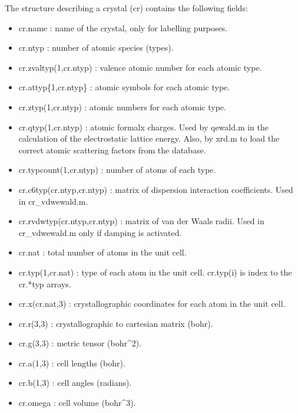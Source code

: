 \documentclass[a4paper]{article}
\begin{document}
The structure describing a crystal (cr) contains the following fields:
%
\begin{itemize}

\item cr.name : name of the crystal, only for labelling purposes.

\item cr.ntyp : number of atomic species (types).

\item cr.zvaltyp(1,cr.ntyp) : valence atomic number for each atomic
type.

\item cr.attyp\{1,cr.ntyp\} : atomic symbols for each atomic type.

\item cr.ztyp(1,cr.ntyp) : atomic numbers for each atomic type.

\item cr.qtyp(1,cr.ntyp) : atomic formalx charges. Used by qewald.m in the
calculation of the electrostatic lattice energy. Also, by xrd.m to
load the correct atomic scattering factors from the database.

\item cr.typcount(1,cr.ntyp) : number of atoms of each type.

\item cr.c6typ(cr.ntyp,cr.ntyp) : matrix of dispersion interaction
coefficients. Used in cr\_vdwewald.m.

\item cr.rvdwtyp(cr.ntyp,cr.ntyp) : matrix of van der Waals radii. Used
in cr\_vdwewald.m only if damping is activated.

\item cr.nat : total number of atoms in the unit cell.

\item cr.typ(1,cr.nat) : type of each atom in the unit cell. cr.typ(i)
is index to the cr.*typ arrays.

\item cr.x(cr.nat,3) : crystallographic coordinates for each atom in the
unit cell.

\item cr.r(3,3) : crystallographic to cartesian matrix (bohr).

\item cr.g(3,3) : metric tensor (bohr\textasciicircum{}2).

\item cr.a(1,3) : cell lengths (bohr).

\item cr.b(1,3) : cell angles (radians).

\item cr.omega : cell volume (bohr\textasciicircum{}3).

\end{itemize}
\end{document}
